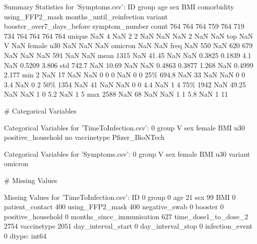 \documentclass[11pt]{article}
\begin{document}
\begin{codeoutput}
Summary Statistics for 'Symptoms.csv':
          ID group   age     sex  BMI  comorbidity  using\_FFP2\_mask  months\_until\_reinfection  variant  booster\_over7\_days\_before  symptom\_number
count    764   764   764     759  764          719              734                       764      764                        764             764
unique   NaN     4   NaN       2    2          NaN              NaN                       NaN        2                        NaN             NaN
top      NaN     V   NaN  female  u30          NaN              NaN                       NaN  omicron                        NaN             NaN
freq     NaN   550   NaN     620  679          NaN              NaN                       NaN      591                        NaN             NaN
mean    1315   NaN 41.45     NaN  NaN       0.3825           0.1839                       4.1      NaN                     0.5209           3.806
std    742.7   NaN 10.69     NaN  NaN       0.4863           0.3877                     1.268      NaN                     0.4999           2.177
min        2   NaN    17     NaN  NaN            0                0                         0      NaN                          0               0
25\%    694.8   NaN    33     NaN  NaN            0                0                       3.4      NaN                          0               2
50\%     1354   NaN    41     NaN  NaN            0                0                       4.4      NaN                          1               4
75\%     1942   NaN 49.25     NaN  NaN            1                0                       5.2      NaN                          1               5
max     2588   NaN    68     NaN  NaN            1                1                       5.8      NaN                          1              11

\# Categorical Variables

Categorical Variables for 'TimeToInfection.csv':
                                  0
group                             V
sex                          female
BMI                             u30
positive\_household               no
vaccinetype         Pfizer\_BioNTech

Categorical Variables for 'Symptoms.csv':
               0
group          V
sex       female
BMI          u30
variant  omicron

\# Missing Values

Missing Values for 'TimeToInfection.csv':
ID                              0
group                           0
age                            21
sex                            99
BMI                             0
patient\_contact               400
using\_FFP2\_mask               400
negative\_swab                   0
booster                         0
positive\_household              0
months\_since\_immunisation     627
time\_dose1\_to\_dose\_2         2754
vaccinetype                  2051
day\_interval\_start              0
day\_interval\_stop               0
infection\_event                 0
dtype: int64


\end{codeoutput}
\end{document}
